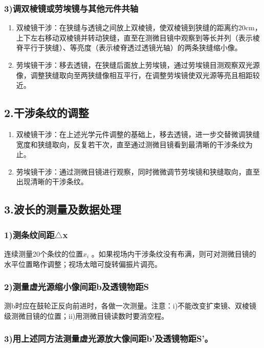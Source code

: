 \documentclass[11pt,a4paper,oneside]{article}
\begin{document}
\subsubsection*{3)调双棱镜或劳埃镜与其他元件共轴}
\begin{enumerate}
\item 双棱镜干涉：在狭缝与透镜之间放上双棱镜，使双棱镜到狭缝的距离约20cm，上下左右移动双棱镜并转动狭缝，直至在测微目镜中观察到等长并列（表示棱脊平行于狭缝）、等亮度（表示棱脊透过透镜光轴）的两条狭缝缩小像。
\item 劳埃镜干涉：移去透镜，在狭缝后面放上劳埃镜，通过劳埃镜目测观察双光源像，调整狭缝取向至两狭缝像相互平行，在调整劳埃镜使双光源等亮且相距较近。
\end{enumerate}

\subsection*{2.干涉条纹的调整}
\begin{enumerate}
\item 双棱镜干涉：在上述光学元件调整的基础上，移去透镜，进一步交替微调狭缝宽度和狭缝取向，反复若干次，直至通过测微目镜看到最清晰的干涉条纹为止。
\item 劳埃镜干涉：通过测微目镜进行观察，同时微微调节劳埃镜和狭缝取向，直至出现清晰的干涉条纹。
\end{enumerate}

\subsection*{3.波长的测量及数据处理}
\subsubsection*{1)测条纹间距${\bigtriangleup}$x}
连续测量20个条纹的位置${x_i}$ 。如果视场内干涉条纹没有布满，则可对测微目镜的水平位置略作调整；视场太暗可旋转偏振片调亮。
\subsubsection*{2)测量虚光源缩小像间距b及透镜物距S}
测b时应在鼓轮正反向前进时，各做一次测量。注意：i)不能改变扩束镜、双棱镜级测微目镜的位置；ii)用测微目镜读数时要消空程。
\subsubsection*{3)用上述同方法测量虚光源放大像间距b’及透镜物距S’。}
\end{document}
